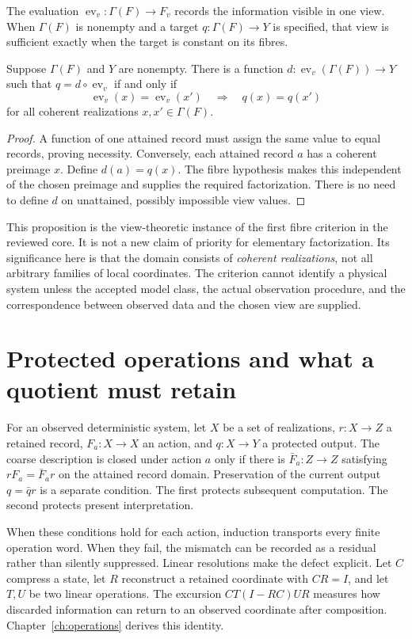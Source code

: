 The evaluation $\operatorname{ev}_v:\Gamma(F)\to F_v$ records the information visible in one view. When $\Gamma(F)$ is nonempty and a target $q:\Gamma(F)\to Y$ is specified, that view is sufficient exactly when the target is constant on its fibres.
\begin{proposition}\label{r:viewfactor}
Suppose $\Gamma(F)$ and $Y$ are nonempty. There is a function $d:\operatorname{ev}_v(\Gamma(F))\to Y$ such that $q=d\circ\operatorname{ev}_v$ if and only if
\[
\operatorname{ev}_v(x)=\operatorname{ev}_v(x')\quad\Longrightarrow\quad q(x)=q(x')
\]
for all coherent realizations $x,x'\in\Gamma(F)$.
\end{proposition}
\begin{proof}
A function of one attained record must assign the same value to equal records, proving necessity. Conversely, each attained record $a$ has a coherent preimage $x$. Define $d(a)=q(x)$. The fibre hypothesis makes this independent of the chosen preimage and supplies the required factorization. There is no need to define $d$ on unattained, possibly impossible view values.
\end{proof}

This proposition is the view-theoretic instance of the first fibre criterion in the reviewed core. It is not a new claim of priority for elementary factorization. Its significance here is that the domain consists of \emph{coherent realizations}, not all arbitrary families of local coordinates. The criterion cannot identify a physical system unless the accepted model class, the actual observation procedure, and the correspondence between observed data and the chosen view are supplied.

\section*{Protected operations and what a quotient must retain}
For an observed deterministic system, let $X$ be a set of realizations, $r:X\to Z$ a retained record, $F_a:X\to X$ an action, and $q:X\to Y$ a protected output. The coarse description is closed under action $a$ only if there is $\bar F_a:Z\to Z$ satisfying $rF_a=\bar F_a r$ on the attained record domain. Preservation of the current output $q=\bar q r$ is a separate condition. The first protects subsequent computation. The second protects present interpretation.

When these conditions hold for each action, induction transports every finite operation word. When they fail, the mismatch can be recorded as a residual rather than silently suppressed. Linear resolutions make the defect explicit. Let $C$ compress a state, let $R$ reconstruct a retained coordinate with $CR=I$, and let $T,U$ be two linear operations. The excursion $CT(I-RC)UR$ measures how discarded information can return to an observed coordinate after composition. Chapter~\ref{ch:operations} derives this identity.

